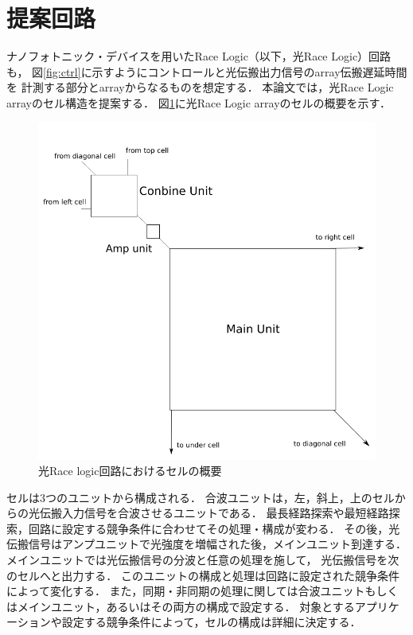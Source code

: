 \section{提案回路}
ナノフォトニック・デバイスを用いたRace Logic（以下，光Race Logic）回路も，
図\ref{fig:ctrl}に示すようにコントロールと光伝搬出力信号のarray伝搬遅延時間を
計測する部分とarrayからなるものを想定する．
本論文では，光Race Logic arrayのセル構造を提案する．
図\ref{fig:lightracelogiccell}に光Race Logic arrayのセルの概要を示す．
\begin{figure}[t!]
\begin{center}
\includegraphics[keepaspectratio,scale=0.5]{fig/3/lightracelogic_cell_1.png}
\caption{光Race logic回路におけるセルの概要}
\label{fig:lightracelogiccell}
\end{center}
\end{figure}

セルは3つのユニットから構成される．
合波ユニットは，左，斜上，上のセルからの光伝搬入力信号を合波させるユニットである．
最長経路探索や最短経路探索，回路に設定する競争条件に合わせてその処理・構成が変わる．
その後，光伝搬信号はアンプユニットで光強度を増幅された後，メインユニット到達する．
メインユニットでは光伝搬信号の分波と任意の処理を施して，
光伝搬信号を次のセルへと出力する．
このユニットの構成と処理は回路に設定された競争条件によって変化する．
また，同期・非同期の処理に関しては合波ユニットもしくはメインユニット，あるいはその両方の構成で設定する．
対象とするアプリケーションや設定する競争条件によって，セルの構成は詳細に決定する．

